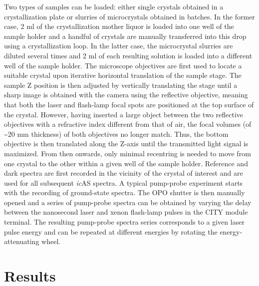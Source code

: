Two types of samples can be loaded: either single crystals obtained in a crystallization plate or slurries of microcrystals obtained in batches. In the former case, 2 ml of the crystallization mother liquor is loaded into one well of the sample holder and a handful of crystals are manually transferred into this drop using a crystallization loop. In the latter case, the microcrystal slurries are diluted several times and 2 ml of each resulting solution is loaded into a different well of the sample holder. The microscope objectives are first used to locate a suitable crystal upon iterative horizontal translation of the sample stage. The sample Z position is then adjusted by vertically translating the stage until a sharp image is obtained with the camera using the reflective objective, meaning that both the laser and flash-lamp focal spots are positioned at the top surface of the crystal. However, having inserted a large object between the two reflective objectives with a refractive index different from that of air, the focal volumes (of \textasciitilde20 mm thickness) of both objectives no longer match. Thus, the bottom objective is then translated along the Z-axis until the transmitted light signal is maximized. From then onwards, only minimal recentring is needed to move from one crystal to the other within a given well of the sample holder. Reference and dark spectra are first recorded in the vicinity of the crystal of interest and are used for all subsequent \textit{ic}AS spectra. A typical pump-probe experiment starts with the recording of ground-state spectra. The OPO shutter is then manually opened and a series of pump-probe spectra can be obtained by varying the delay between the nanosecond laser and xenon flash-lamp pulses in the CITY module terminal. The resulting pump-probe spectra series corresponds to a given laser pulse energy and can be repeated at different energies by rotating the energy-attenuating wheel.

\section{Results}


